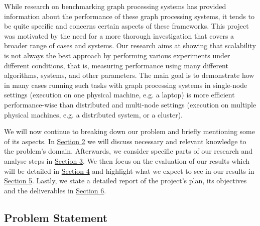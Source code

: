 \documentclass[a4paper,11pt]{article}
\begin{document}
\par While research on benchmarking graph processing systems has provided information about the performance of these graph processing systems, it tends to be quite specific and concerns certain aspects of these frameworks. This project was motivated by the need for a more thorough investigation that covers a broader range of cases and systems. Our research aims at showing that scalability is not always the best approach by performing various experiments under different conditions, that is, measuring performance using many different algorithms, systems, and other parameters. The main goal is to demonstrate how in many cases running such tasks with graph processing systems in single-node settings (execution on one physical machine, e.g. a laptop) is more efficient performance-wise than distributed and multi-node settings (execution on multiple physical machines, e.g. a distributed system, or a cluster).

\par We will now continue to breaking down our problem and briefly mentioning some of its aspects. In \hyperref[background]{Section 2} we will discuss necessary and relevant knowledge to the problem's domain. Afterwards, we consider specific parts of our research and analyse steps in \hyperref[methodology]{Section 3}. We then focus on the evaluation of our results which will be detailed in \hyperref[evaluation]{Section 4} and highlight what we expect to see in our results in \hyperref[outcomes]{Section 5}. Lastly, we state a detailed report of the project's plan, its objectives and the deliverables in \hyperref[milestones]{Section 6}.


\subsection{Problem Statement} \label{problem-statement}
\end{document}
